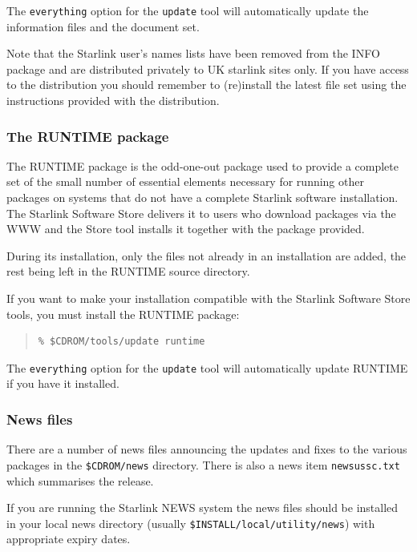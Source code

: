 \documentclass[twoside,11pt]{article}
\newcommand{\xlabel}[1]{}
\renewcommand{\_}{\texttt{\symbol{95}}}
\begin{document}
The \texttt{everything} option for the \texttt{update} tool will
automatically update the information files and the document set.

Note that the Starlink user's names lists have been removed from the INFO
package and are distributed privately to UK starlink sites only.  If you
have access to the distribution you should remember to (re)install the
latest file set using the instructions provided with the distribution.

\subsubsection{\xlabel{the_runtime_set}The RUNTIME package}
\label{the_runtime_set}

The RUNTIME package is the odd-one-out package used to provide a complete set of
the small number of essential elements necessary for running other
packages on systems that do not have a complete Starlink software
installation.  The Starlink Software Store delivers it to users who
download packages via the WWW and the Store tool installs it together with
the package provided.

During its installation, only the files not already in an installation
are added, the rest being left in the RUNTIME source directory.

If you want to make your installation compatible with the Starlink Software
Store tools, you must install the RUNTIME package:

\begin{quote}
\begin{verbatim}
% $CDROM/tools/update runtime
\end{verbatim}
\end{quote}

The \texttt{everything} option for the \texttt{update} tool will
automatically update RUNTIME if you have it installed.

\subsubsection{News files}

There are a number of news files announcing the updates and fixes to
the various packages in the \texttt{\$CDROM/news} directory.  There is also
a news item \texttt{news\_ussc.txt} which summarises the release.

If you are running the Starlink NEWS system the news files should be
installed in your local news directory (usually
\texttt{\$INSTALL/local/utility/news}) with appropriate expiry dates.
\end{document}
